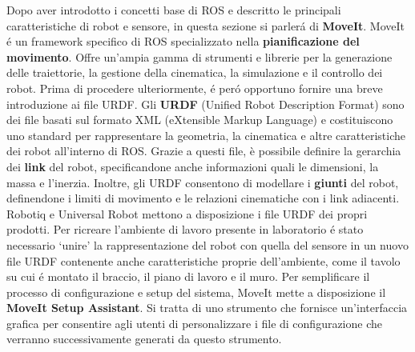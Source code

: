 Dopo aver introdotto i concetti base di ROS e descritto le principali caratteristiche di robot e sensore, in questa sezione si 
parler\'{a} di \textbf{MoveIt}. 
MoveIt \'{e} un framework specifico di ROS specializzato nella \textbf{pianificazione del movimento}. Offre un'ampia gamma 
di strumenti e librerie per la generazione delle traiettorie, la gestione della cinematica, la simulazione e il controllo 
dei robot. 
Prima di procedere ulteriormente, \'{e} per\'{o} opportuno fornire una breve introduzione ai file URDF.
Gli \textbf{URDF} (Unified Robot Description Format) sono dei file basati sul formato XML (eXtensible Markup Language) e 
costituiscono uno standard per rappresentare la geometria, la cinematica e altre caratteristiche dei robot all'interno di ROS. 
Grazie a questi file, è possibile definire la gerarchia dei \textbf{link} del robot, specificandone anche informazioni quali  
le dimensioni, la massa e l'inerzia. Inoltre, gli URDF consentono di modellare i \textbf{giunti}
del robot, definendone i limiti di movimento e le relazioni cinematiche con i link adiacenti. 
Robotiq e Universal Robot mettono a disposizione i file URDF dei propri prodotti. Per ricreare l'ambiente di lavoro presente in 
laboratorio \'{e} stato necessario `unire' la rappresentazione del robot con quella del sensore in un nuovo file URDF contenente 
anche caratteristiche proprie dell'ambiente, come il tavolo su cui \'{e} montato il braccio, il piano di lavoro e il muro. 
Per semplificare il processo di configurazione e setup del sistema, MoveIt mette a disposizione il \textbf{MoveIt Setup Assistant}. 
Si tratta di uno strumento che fornisce un'interfaccia grafica per consentire agli utenti di personalizzare i file di configurazione 
che verranno successivamente generati da questo strumento. 